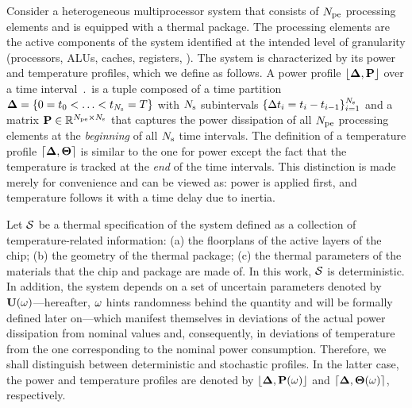 Consider a heterogeneous multiprocessor system that consists of ${N_\text{pe}}$ processing elements and is equipped with a thermal package. The processing elements are the active components of the system identified at the intended level of granularity (processors, ALUs, caches, registers, \etc). The system is characterized by its power and temperature profiles, which we define as follows. A power profile $\profP$ over a time interval $\period$ is a tuple composed of a time partition $\boldsymbol{\Delta} = \{ 0 = t_0 < \dotsc < t_{N_\text{s}} = T \}$ with $N_\text{s}$ subintervals $\{ \Delta t_i = t_i - t_{i - 1} \}_{i = 1}^{N_\text{s}}$ and a matrix $\mP \in \real^{\cores \times \steps}$ that captures the power dissipation of all ${N_\text{pe}}$ processing elements at the \emph{beginning} of all $N_\text{s}$ time intervals. The definition of a temperature profile $\profT$ is similar to the one for power except the fact that the temperature is tracked at the \emph{end} of the time intervals. This distinction is made merely for convenience and can be viewed as: power is applied first, and temperature follows it with a time delay due to inertia.

Let $\mathcal{S}$ be a thermal specification of the system defined as a collection of temperature-related information: (a) the floorplans of the active layers of the chip; (b) the geometry of the thermal package; (c) the thermal parameters of the materials that the chip and package are made of. In this work, $\mathcal{S}$ is deterministic. In addition, the system depends on a set of uncertain parameters denoted by $\mathbf{U}(\omega)$---hereafter, $\omega$ hints randomness behind the quantity and will be formally defined later on---which manifest themselves in deviations of the actual power dissipation from nominal values and, consequently, in deviations of temperature from the one corresponding to the nominal power consumption. Therefore, we shall distinguish between deterministic and stochastic profiles. In the latter case, the power and temperature profiles are denoted by $\profP{\o}$ and $\profT{\o}$, respectively.

